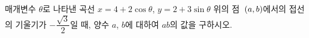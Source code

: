 매개변수 $\theta$로 나타낸 곡선 $x=4+2\cos\theta$, $y=2+3\sin\theta$ 위의 점~$(a{,}\mkern3mu\mathopen{}b)$에서의 접선의 기울기가 $-\dfrac{\sqrt{3}}{2}$일 때, 양수 $a$, $b$에 대하여 $ab$의 값을 구하시오. 
